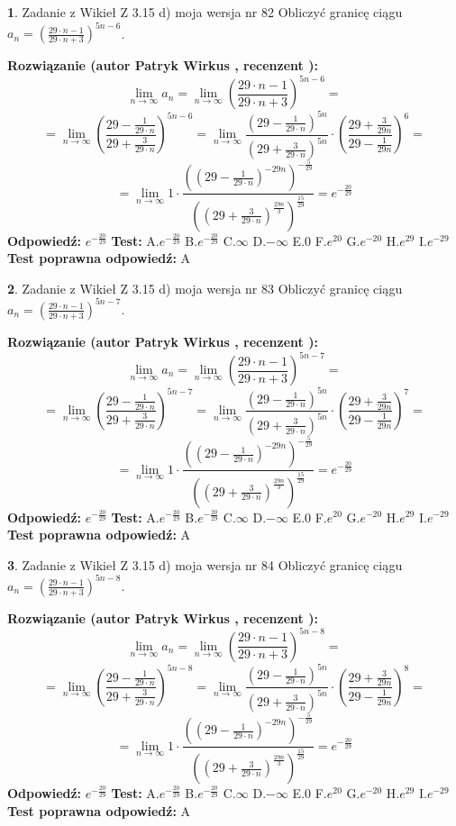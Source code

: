 \documentclass[12pt, a4paper]{article}
\theoremstyle{definition} %
\newtheorem{zad}{}
\newcommand{\zadStart}[1]{\begin{zad}#1\newline}
\newcommand{\zadStop}{\end{zad}}
\newcommand{\rozwStart}[2]{\noindent \textbf{Rozwiązanie (autor #1 , recenzent #2): }\newline}
\newcommand{\rozwStop}{\newline}
\newcommand{\odpStart}{\noindent \textbf{Odpowiedź:}\newline}
\newcommand{\odpStop}{\newline}
\newcommand{\testStart}{\noindent \textbf{Test:}\newline}
\newcommand{\testStop}{\newline}
\newcommand{\kluczStart}{\noindent \textbf{Test poprawna odpowiedź:}\newline}
\newcommand{\kluczStop}{\newline}
\begin{document}
\zadStart{Zadanie z Wikieł Z 3.15 d) moja wersja nr 82}
Obliczyć granicę ciągu $a_{n}=(\frac{29\cdot n - 1}{29 \cdot n + 3})^{5n-6}$.
\zadStop
\rozwStart{Patryk Wirkus}{}
$$\lim\limits_{n\to\infty} a_{n} = \lim\limits_{n\to\infty}(\frac{29\cdot n - 1}{29 \cdot n + 3})^{5n-6}=$$
$$=\lim\limits_{n\to\infty}(\frac{29 - \frac{1}{29\cdot n}}{29 + \frac{3}{29 \cdot n}})^{5n-6}=\lim\limits_{n\to\infty}\frac{(29 - \frac{1}{29\cdot n})^{5n}}{(29 + \frac{3}{29\cdot n})^{5n}} \cdot (\frac{29+\frac{3}{29n}}{29-\frac{1}{29n}})^{6}=$$
$$=\lim\limits_{n\to\infty} 1 \cdot \frac{((29-\frac{1}{29 \cdot n})^{-29n})^{-\frac{5}{29}}}{((29+\frac{3}{29 \cdot n})^{\frac{29n}{3}})^{\frac{15}{29}}} =e^{-\frac{20}{29}}$$
\rozwStop
\odpStart
$e^{-\frac{20}{29}}$
\odpStop
\testStart
A.$ e^{-\frac{20}{29}}$
B.$ e^{-\frac{20}{29}}$
C.$\infty$
D.$-\infty$
E.$0$
F.$e^{20}$
G.$e^{-20}$
H.$e^{29}$
I.$e^{-29}$
\testStop
\kluczStart
A
\kluczStop



\zadStart{Zadanie z Wikieł Z 3.15 d) moja wersja nr 83}
Obliczyć granicę ciągu $a_{n}=(\frac{29\cdot n - 1}{29 \cdot n + 3})^{5n-7}$.
\zadStop
\rozwStart{Patryk Wirkus}{}
$$\lim\limits_{n\to\infty} a_{n} = \lim\limits_{n\to\infty}(\frac{29\cdot n - 1}{29 \cdot n + 3})^{5n-7}=$$
$$=\lim\limits_{n\to\infty}(\frac{29 - \frac{1}{29\cdot n}}{29 + \frac{3}{29 \cdot n}})^{5n-7}=\lim\limits_{n\to\infty}\frac{(29 - \frac{1}{29\cdot n})^{5n}}{(29 + \frac{3}{29\cdot n})^{5n}} \cdot (\frac{29+\frac{3}{29n}}{29-\frac{1}{29n}})^{7}=$$
$$=\lim\limits_{n\to\infty} 1 \cdot \frac{((29-\frac{1}{29 \cdot n})^{-29n})^{-\frac{5}{29}}}{((29+\frac{3}{29 \cdot n})^{\frac{29n}{3}})^{\frac{15}{29}}} =e^{-\frac{20}{29}}$$
\rozwStop
\odpStart
$e^{-\frac{20}{29}}$
\odpStop
\testStart
A.$ e^{-\frac{20}{29}}$
B.$ e^{-\frac{20}{29}}$
C.$\infty$
D.$-\infty$
E.$0$
F.$e^{20}$
G.$e^{-20}$
H.$e^{29}$
I.$e^{-29}$
\testStop
\kluczStart
A
\kluczStop



\zadStart{Zadanie z Wikieł Z 3.15 d) moja wersja nr 84}
Obliczyć granicę ciągu $a_{n}=(\frac{29\cdot n - 1}{29 \cdot n + 3})^{5n-8}$.
\zadStop
\rozwStart{Patryk Wirkus}{}
$$\lim\limits_{n\to\infty} a_{n} = \lim\limits_{n\to\infty}(\frac{29\cdot n - 1}{29 \cdot n + 3})^{5n-8}=$$
$$=\lim\limits_{n\to\infty}(\frac{29 - \frac{1}{29\cdot n}}{29 + \frac{3}{29 \cdot n}})^{5n-8}=\lim\limits_{n\to\infty}\frac{(29 - \frac{1}{29\cdot n})^{5n}}{(29 + \frac{3}{29\cdot n})^{5n}} \cdot (\frac{29+\frac{3}{29n}}{29-\frac{1}{29n}})^{8}=$$
$$=\lim\limits_{n\to\infty} 1 \cdot \frac{((29-\frac{1}{29 \cdot n})^{-29n})^{-\frac{5}{29}}}{((29+\frac{3}{29 \cdot n})^{\frac{29n}{3}})^{\frac{15}{29}}} =e^{-\frac{20}{29}}$$
\rozwStop
\odpStart
$e^{-\frac{20}{29}}$
\odpStop
\testStart
A.$ e^{-\frac{20}{29}}$
B.$ e^{-\frac{20}{29}}$
C.$\infty$
D.$-\infty$
E.$0$
F.$e^{20}$
G.$e^{-20}$
H.$e^{29}$
I.$e^{-29}$
\testStop
\kluczStart
A
\kluczStop
\end{document}
